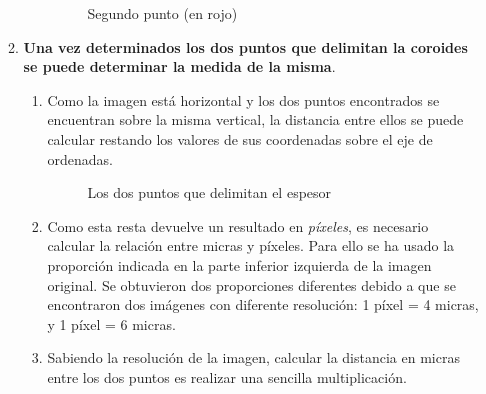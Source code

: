 \begin{enumerate}
\begin{enumerate}[label*=\arabic*.]
\begin{enumerate}[label*=\arabic*.]
      \begin{figure}[H]
        \caption{Segundo punto (en rojo)}
        \centering \setlength\fboxsep{0pt} \setlength\fboxrule{0.5pt}
      \end{figure}

    \end{enumerate}
  \item \textbf{Una vez determinados los dos puntos que delimitan la
      \gls{coroides} se puede determinar la medida de la misma}.
    \begin{enumerate}[label*=\arabic*.]
    \item Como la imagen está horizontal y los dos puntos encontrados
      se encuentran sobre la misma vertical, la distancia entre ellos
      se puede calcular restando los valores de sus coordenadas sobre
      el eje de ordenadas.

      \begin{figure}[H]
        \caption{Los dos puntos que delimitan el espesor}
        \centering \setlength\fboxsep{0pt} \setlength\fboxrule{0.5pt}
      \end{figure}

    \item Como esta resta devuelve un resultado en \emph{píxeles}, es
      necesario calcular la relación entre micras y píxeles. Para ello
      se ha usado la proporción indicada en la parte inferior
      izquierda de la imagen original. Se obtuvieron dos proporciones
      diferentes debido a que se encontraron dos imágenes con
      diferente resolución: 1 píxel = 4 micras, y 1 píxel = 6 micras.
    \item Sabiendo la resolución de la imagen, calcular la distancia
      en micras entre los dos puntos es realizar una sencilla
      multiplicación.


\end{enumerate}
\end{enumerate}
\end{enumerate}

